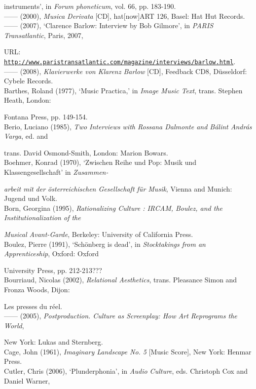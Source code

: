 instruments', in \emph{Forum phoneticum}, vol. 66, pp. 183-190.
\hypertarget{barlowcd}{}\\
------ (2000), \emph{Musica Derivata} [CD], hat[now]ART 126, Basel: Hat Hut Records. 
\hypertarget{barlowbob}{}\\
------ (2007), `Clarence Barlow: Interview by Bob Gilmore', in \emph{PARIS Transatlantic}, Paris, 2007, 

URL: \href{http://www.paristransatlantic.com/magazine/interviews/barlow.html}{\texttt {http://www.paristransatlantic.com/magazine/interviews/barlow.html}}.
\hypertarget{barlowpiano}{}\\
------ (2008), \emph{Klavierwerke von Klarenz Barlow} [CD], Feedback CD8, D\"{u}sseldorf: Cybele Records. 
\hypertarget{barthes}{}\\
Barthes, Roland (1977), `Music Practica,' in \emph{Image Music Text}, trans. Stephen Heath, London: 

Fontana Press, pp. 149-154. 
\hypertarget{berio}{}\\
Berio, Luciano (1985), \emph{Two Interviews with Rossana Dalmonte and B\'{a}lint Andr\'{a}s Varga},  ed. and 

trans. David Osmond-Smith, London: Marion Bowars. 
\hypertarget{boehmer}{}\\
Boehmer, Konrad (1970), `Zwischen Reihe und Pop: Musik und Klassengesellschaft' in \emph{Zusammen-}

\emph{arbeit mit der \"{o}sterreichischen Gesellschaft f\"{u}r Musik}, Vienna and Munich: Jugend und Volk.
\hypertarget{born}{}\\
Born, Georgina (1995), \emph{Rationalizing Culture : IRCAM, Boulez, and the Institutionalization of the}

\emph{Musical Avant-Garde}, Berkeley: University of California Press. 
\hypertarget{boulez}{}\\
Boulez, Pierre (1991), `Sch\"{o}nberg is dead', in \emph{Stocktakings from an Apprenticeship}, Oxford: Oxford 

University Press, pp. 212-213??? 
\hypertarget{relational}{}\\
Bourriaud, Nicolas (2002), \emph{Relational Aesthetics}, trans. Pleasance Simon and Fronza Woods, Dijon: 

Les presses du r\'{e}el.
\hypertarget{postproduction}{}\\
------ (2005),  \emph{Postproduction. Culture as Screenplay: How Art Reprograms the World}, 

New York: Lukas and Sternberg.
\hypertarget{cage}{}\\
Cage, John (1961), \emph{Imaginary Landscape No. 5} [Music Score], New York: Henmar Press. 
\hypertarget{cutler}{}\\
Cutler, Chris (2006),  `Plunderphonia', in \emph{Audio Culture}, eds. Christoph Cox and Daniel Warner, 

